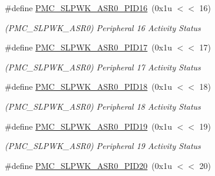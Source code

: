 \begin{DoxyCompactItemize}
\mbox{\label{group__SAMV71__PMC_ga8152787ef2359f80ad8c2d2f4db429db}} 
\#define \mbox{\hyperlink{group__SAMV71__PMC_ga8152787ef2359f80ad8c2d2f4db429db}{P\+M\+C\+\_\+\+S\+L\+P\+W\+K\+\_\+\+A\+S\+R0\+\_\+\+P\+I\+D16}}~(0x1u $<$$<$ 16)
\begin{DoxyCompactList}\small\item\em (P\+M\+C\+\_\+\+S\+L\+P\+W\+K\+\_\+\+A\+S\+R0) Peripheral 16 Activity Status \end{DoxyCompactList}\item 
\mbox{\label{group__SAMV71__PMC_gaa659ed2d3895acf83e0efcfd9bb561c1}} 
\#define \mbox{\hyperlink{group__SAMV71__PMC_gaa659ed2d3895acf83e0efcfd9bb561c1}{P\+M\+C\+\_\+\+S\+L\+P\+W\+K\+\_\+\+A\+S\+R0\+\_\+\+P\+I\+D17}}~(0x1u $<$$<$ 17)
\begin{DoxyCompactList}\small\item\em (P\+M\+C\+\_\+\+S\+L\+P\+W\+K\+\_\+\+A\+S\+R0) Peripheral 17 Activity Status \end{DoxyCompactList}\item 
\mbox{\label{group__SAMV71__PMC_ga8c5ef4dc4783f64e8b0801b824993449}} 
\#define \mbox{\hyperlink{group__SAMV71__PMC_ga8c5ef4dc4783f64e8b0801b824993449}{P\+M\+C\+\_\+\+S\+L\+P\+W\+K\+\_\+\+A\+S\+R0\+\_\+\+P\+I\+D18}}~(0x1u $<$$<$ 18)
\begin{DoxyCompactList}\small\item\em (P\+M\+C\+\_\+\+S\+L\+P\+W\+K\+\_\+\+A\+S\+R0) Peripheral 18 Activity Status \end{DoxyCompactList}\item 
\mbox{\label{group__SAMV71__PMC_gafa8d37c0c66e77cba10ba30705e84c0f}} 
\#define \mbox{\hyperlink{group__SAMV71__PMC_gafa8d37c0c66e77cba10ba30705e84c0f}{P\+M\+C\+\_\+\+S\+L\+P\+W\+K\+\_\+\+A\+S\+R0\+\_\+\+P\+I\+D19}}~(0x1u $<$$<$ 19)
\begin{DoxyCompactList}\small\item\em (P\+M\+C\+\_\+\+S\+L\+P\+W\+K\+\_\+\+A\+S\+R0) Peripheral 19 Activity Status \end{DoxyCompactList}\item 
\mbox{\label{group__SAMV71__PMC_ga114081446573726684cd5acd66fda51d}} 
\#define \mbox{\hyperlink{group__SAMV71__PMC_ga114081446573726684cd5acd66fda51d}{P\+M\+C\+\_\+\+S\+L\+P\+W\+K\+\_\+\+A\+S\+R0\+\_\+\+P\+I\+D20}}~(0x1u $<$$<$ 20)
$$
\end{DoxyCompactItemize}
